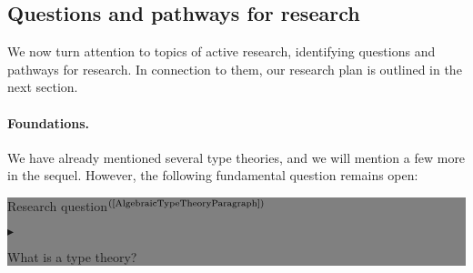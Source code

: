 \documentclass[11pt,twocolumn]{article}
\newenvironment{btritemize}
  {\begin{list}{\btr}
  {\setlength{\topsep}{2pt}
   \setlength{\partopsep}{2pt}
   \setlength{\itemsep}{2.5pt}
   \setlength{\parsep}{2.5pt}
   \setlength{\leftmargin}{1em}
   \setlength{\labelwidth}{.5em}}}
  {\end{list}}
\newcommand{\mytextsf}[1]{\textsf{\small #1}}
\newcommand{\hide}[1]{}
\newcommand{\pref}[1]{\,(\ref{#1})}
\newcommand{\btr}{$\blacktriangleright$}
\newcommand{\reqpsize}{8.113395cm}%
\newcommand{\req}[2]{\begin{center}\colorbox{grey}{\begin{minipage}{\reqpsize} 
  \mytextsf{Research question}\hfill$^{\mbox{\scriptsize #1 }}$\\[-5.5mm]
  \begin{btritemize}
  \item #2
  \end{btritemize}
\end{minipage}}\end{center}}
\begin{document}
\subsection{Questions and pathways for research}

We now %
turn attention to topics of active research, identifying questions and
pathways for research.  In connection to them, our research plan is
outlined in the next section.

\setcounter{paragraph}{0}
\paragraph{Foundations.}

We have already mentioned several type theories, and we will mention a few
more in the sequel.  However, the following fundamental question remains
open:
\req{(\ref{AlgebraicTypeTheoryParagraph})}
{What is a type theory?}

\hide{
Section\pref{AlgebraicTypeTheoryParagraph} aims at a comprehensive
mathematical answer, that will also serve as a framework for our other
type-theoretic developments.  
\hide{
  We regard this as a step towards the related open question:
\req{}{What is a programming language?}
that will be kept in the background of our investigations.
}
}
\end{document}
